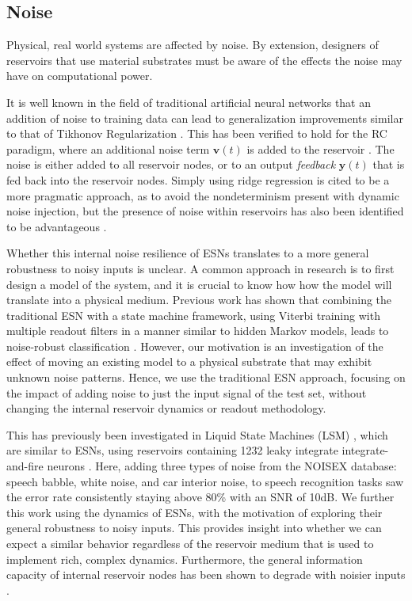 \subsection{Noise}

Physical, real world systems are affected by noise. By extension, designers of
reservoirs that use material substrates must be aware of the effects the noise
may have on computational power.

It is well known in the field of traditional artificial neural networks that an
addition of noise to training data can lead to generalization improvements
similar to that of Tikhonov Regularization \cite{bishop_training_1995}. This has
been verified to hold for the RC paradigm, where an additional noise term
$\mathbf{v}(t)$ is added to the reservoir \cite{jaeger_echo_2001}. The noise is
either added to all reservoir nodes, or to an output \textit{feedback}
$\mathbf{y}(t)$ that is fed back into the reservoir nodes. Simply using ridge
regression is cited to be a more pragmatic approach, as to avoid the
nondeterminism present with dynamic noise injection, but the presence of noise
within reservoirs has also been identified to be advantageous
\cite{kurkova_stable_2008}.

Whether this internal noise resilience of ESNs translates to a more general
robustness to noisy inputs is unclear. A common approach in research is to first
design a model of the system, and it is crucial to know how how the model will
translate into a physical medium. Previous work has shown that combining the
traditional ESN with a state machine framework, using Viterbi training with
multiple readout filters in a manner similar to hidden Markov models, leads to
noise-robust classification \cite{skowronski_noise-robust_2007}. However, our
motivation is an investigation of the effect of moving an existing model to a
physical substrate that may exhibit unknown noise patterns. Hence, we use the
traditional ESN approach, focusing on the impact of adding noise to just the
input signal of the test set, without changing the internal reservoir dynamics
or readout methodology.

This has previously been investigated in Liquid State Machines (LSM)
\cite{maass_real-time_2002}, which are similar to ESNs, using reservoirs
containing 1232 leaky integrate integrate-and-fire neurons
\cite{verstraeten_isolated_2005}. Here, adding three types of noise from the
NOISEX database: speech babble, white noise, and car interior noise, to speech
recognition tasks saw the error rate consistently staying above 80\% with an SNR
of 10dB. We further this work using the dynamics of ESNs, with the motivation of
exploring their general robustness to noisy inputs. This provides insight into
whether we can expect a similar behavior regardless of the reservoir medium that
is used to implement rich, complex dynamics. Furthermore, the general
information capacity of internal reservoir nodes has been shown to degrade with
noisier inputs \cite{dambre_information_2012}.

